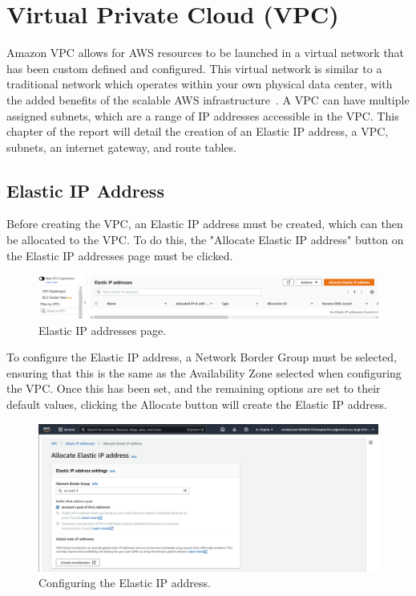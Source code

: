 \chapter{Virtual Private Cloud (VPC)}\label{ch:vpc}

Amazon VPC allows for AWS resources to be launched in a virtual network that has been custom defined and configured.
This virtual network is similar to a traditional network which operates within your own physical data center, with the
added benefits of the scalable AWS infrastructure~\parencite{amazon2022what}.
A VPC can have multiple assigned subnets, which are a range of IP addresses accessible in the VPC\@.
This chapter of the report will detail the creation of an Elastic IP address, a VPC, subnets, an internet gateway, and 
route tables.

\section{Elastic IP Address}\label{sec:elastic-ip-address}

Before creating the VPC, an Elastic IP address must be created, which can then be allocated to the VPC\@.
To do this, the "Allocate Elastic IP address" button on the Elastic IP addresses page must be clicked.

\begin{figure}[!htbp]
    \centering
    \includegraphics[width=\textwidth]{resources/vpc/blank_elastic}
    \caption{Elastic IP addresses page.}
    \label{fig:blank-elastic}
\end{figure}

To configure the Elastic IP address, a Network Border Group must be selected, ensuring that this is the same as the
Availability Zone selected when configuring the VPC\@.
Once this has been set, and the remaining options are set to their default values, clicking the Allocate button will
create the Elastic IP address.

\begin{figure}[!htbp]
    \centering
    \includegraphics[width=\textwidth]{resources/vpc/vpc_elastic_ip_addresses}
    \caption{Configuring the Elastic IP address.}
    \label{fig:config-elastic}
\end{figure}

